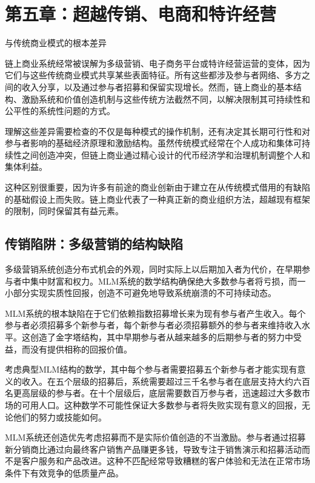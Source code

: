 \documentclass[
  Letterpaper,
]{scrbook}
\begin{document}
\chapter{第五章：超越传销、电商和特许经营}\label{sec-beyond-traditional}

与传统商业模式的根本差异

链上商业系统经常被误解为多级营销、电子商务平台或特许经营运营的变体，因为它们与这些传统商业模式共享某些表面特征。所有这些都涉及参与者网络、多方之间的收入分享，以及通过参与者招募和保留实现增长。然而，链上商业的基本结构、激励系统和价值创造机制与这些传统方法截然不同，以解决限制其可持续性和公平性的系统性问题的方式。

理解这些差异需要检查的不仅是每种模式的操作机制，还有决定其长期可行性和对参与者影响的基础经济原理和激励结构。虽然传统模式经常在个人成功和集体可持续性之间创造冲突，但链上商业通过精心设计的代币经济学和治理机制调整个人和集体利益。

这种区别很重要，因为许多有前途的商业创新由于建立在从传统模式借用的有缺陷的基础假设上而失败。链上商业代表了一种真正新的商业组织方法，超越现有框架的限制，同时保留其有益元素。

\section{传销陷阱：多级营销的结构缺陷}\label{ux4f20ux9500ux9677ux9631ux591aux7ea7ux8425ux9500ux7684ux7ed3ux6784ux7f3aux9677}

多级营销系统创造分布式机会的外观，同时实际上以后期加入者为代价，在早期参与者中集中财富和权力。MLM系统的数学结构确保绝大多数参与者将亏损，而一小部分实现实质性回报，创造不可避免地导致系统崩溃的不可持续动态。

MLM系统的根本缺陷在于它们依赖指数招募增长来为现有参与者产生收入。每个参与者必须招募多个新参与者，每个新参与者必须招募额外的参与者来维持收入水平。这创造了金字塔结构，其中早期参与者从越来越多的后期参与者的努力中受益，而没有提供相称的回报价值。

考虑典型MLM结构的数学，其中每个参与者需要招募五个新参与者才能实现有意义的收入。在五个层级的招募后，系统需要超过三千名参与者在底层支持大约六百名更高层级的参与者。在十个层级后，底层需要数百万参与者，迅速超过大多数市场的可用人口。这种数学不可能性保证大多数参与者将失败实现有意义的回报，无论他们的努力或技能如何。

MLM系统还创造优先考虑招募而不是实际价值创造的不当激励。参与者通过招募新分销商比通过向最终客户销售产品赚更多钱，导致专注于销售演示和招募活动而不是客户服务和产品改进。这种不匹配经常导致糟糕的客户体验和无法在正常市场条件下有效竞争的低质量产品。
\end{document}
